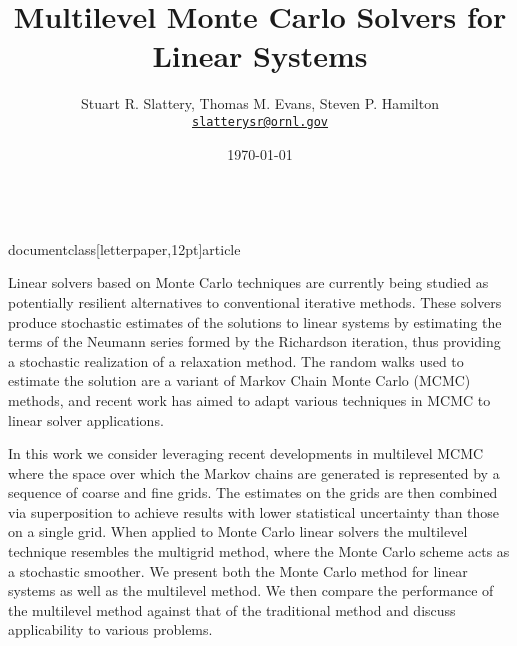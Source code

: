\\documentclass[letterpaper,12pt]{article}
\author{Stuart R. Slattery, Thomas M. Evans, Steven P. Hamilton
\\ \href{mailto:slatterysr@ornl.gov}{\texttt{slatterysr@ornl.gov}}
}
\date{\today} \title{Multilevel Monte Carlo Solvers for Linear Systems}
\begin{document}
\maketitle

\abstract

Linear solvers based on Monte Carlo techniques are currently being
studied as potentially resilient alternatives to conventional
iterative methods. These solvers produce stochastic estimates of the
solutions to linear systems by estimating the terms of the Neumann
series formed by the Richardson iteration, thus providing a stochastic
realization of a relaxation method. The random walks used to estimate
the solution are a variant of Markov Chain Monte Carlo (MCMC) methods,
and recent work has aimed to adapt various techniques in MCMC to
linear solver applications.

In this work we consider leveraging recent developments in multilevel
MCMC where the space over which the Markov chains are generated is
represented by a sequence of coarse and fine grids. The estimates on
the grids are then combined via superposition to achieve results with
lower statistical uncertainty than those on a single grid. When
applied to Monte Carlo linear solvers the multilevel technique
resembles the multigrid method, where the Monte Carlo scheme acts as a
stochastic smoother. We present both the Monte Carlo method for linear
systems as well as the multilevel method. We then compare the
performance of the multilevel method against that of the traditional
method and discuss applicability to various problems.
\end{document}
